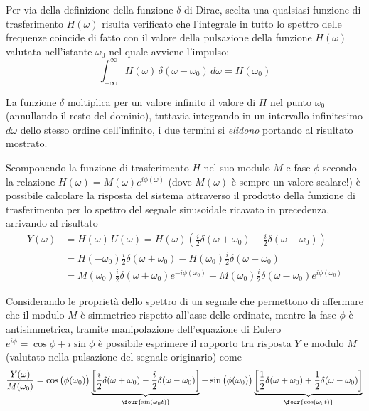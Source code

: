		Per via della definizione della funzione $\delta$ di Dirac, scelta una qualsiasi funzione di trasferimento $H(\omega)$ risulta verificato che l'integrale in tutto lo spettro delle frequenze coincide di fatto con il valore della pulsazione della funzione $H(\omega)$ valutata nell'istante $\omega_0$ nel quale avviene l'impulso:
		\[ \int_{-\infty}^\infty H(\omega)\, \delta(\omega-\omega_0) \, d\omega = H(\omega_0)\]
		\begin{nota}
			La funzione $\delta$ moltiplica per un valore infinito il valore di $H$ nel punto $\omega_0$ (annullando il resto del dominio), tuttavia integrando in un intervallo infinitesimo $d\omega$ dello stesso ordine dell'infinito, i due termini si \textit{elidono} portando al risultato mostrato.
		\end{nota}
		
		Scomponendo la funzione di trasferimento $H$ nel suo modulo $M$ e fase $\phi$ secondo la relazione $H(\omega) = M(\omega) e^{i\phi(\omega)}$ (dove $M(\omega)$ è sempre un valore scalare!)  è possibile calcolare la risposta del sistema attraverso il prodotto della funzione di trasferimento per lo spettro del segnale sinusoidale ricavato in precedenza, arrivando al risultato
		\begin{align*}
			Y(\omega) & = H(\omega) \, U(\omega) = H(\omega) \left(\frac i 2 \delta(\omega + \omega_0) - \frac i 2 \delta(\omega-\omega_0)\right) \\
			& = H(-\omega_0) \frac i 2 \delta(\omega+\omega_0) - H(\omega_0) \frac i 2 \delta(\omega-\omega_0) \\
			& = M(\omega_0) \frac i 2 \delta(\omega+\omega_0) e^{-i\phi(\omega_0)} - M(\omega_0) \frac i 2 \delta(\omega-\omega_0) e^{i\phi(\omega_0)}
		\end{align*}
		
		Considerando le proprietà dello spettro di un segnale che permettono di affermare che il modulo $M$ è simmetrico rispetto all'asse delle ordinate, mentre la fase $\phi$ è antisimmetrica, tramite manipolazione dell'equazione di Eulero $e^{i\phi} = \cos \phi + i\sin\phi$ è possibile esprimere il rapporto tra risposta $Y$ e modulo $M$ (valutato nella pulsazione del segnale originario) come
		\begin{equation*}
			\frac{Y(\omega)}{M(\omega_0)} = \cos \big(\phi(\omega_0)\big) \underbrace{\left[ \frac i 2 \delta(\omega+\omega_0) - \frac i 2 \delta(\omega-\omega_0)\right]}_{\four{\sin(\omega_0 t)}} + \sin \big(\phi(\omega_0)\big) \underbrace{\left[ \frac 1 2 \delta(\omega+\omega_0) + \frac 1 2 \delta(\omega-\omega_0)\right]}_{\four{\cos(\omega_0 t)}}
		\end{equation*}
		
